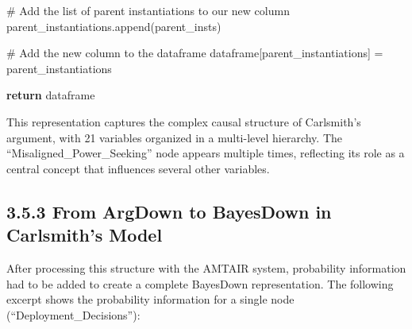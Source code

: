 \documentclass[
  11pt,
  letterpaper,
]{book}
\newenvironment{Shaded}{\begin{snugshade}}{\end{snugshade}}
\newcommand{\CommentTok}[1]{\textcolor[rgb]{0.37,0.37,0.37}{#1}}
\newcommand{\ControlFlowTok}[1]{\textcolor[rgb]{0.00,0.23,0.31}{\textbf{#1}}}
\newcommand{\NormalTok}[1]{\textcolor[rgb]{0.00,0.23,0.31}{#1}}
\newcommand{\OperatorTok}[1]{\textcolor[rgb]{0.37,0.37,0.37}{#1}}
\newcommand{\StringTok}[1]{\textcolor[rgb]{0.13,0.47,0.30}{#1}}
\begin{document}
\begin{landscape}
\begin{Shaded}
\begin{Highlighting}[]
        \CommentTok{\# Add the list of parent instantiations to our new column}
\NormalTok{        parent\_instantiations.append(parent\_insts)}

    \CommentTok{\# Add the new column to the dataframe}
\NormalTok{    dataframe[}\StringTok{\textquotesingle{}parent\_instantiations\textquotesingle{}}\NormalTok{] }\OperatorTok{=}\NormalTok{ parent\_instantiations}

    \ControlFlowTok{return}\NormalTok{ dataframe}
\end{Highlighting}
\end{Shaded}

This representation captures the complex causal structure of Carlsmith's
argument, with 21 variables organized in a multi-level hierarchy. The
``Misaligned\_Power\_Seeking'' node appears multiple times, reflecting
its role as a central concept that influences several other variables.

\subsection*{3.5.3 From ArgDown to BayesDown in Carlsmith's
Model}\label{from-argdown-to-bayesdown-in-carlsmiths-model}

After processing this structure with the AMTAIR system, probability
information had to be added to create a complete BayesDown
representation. The following excerpt shows the probability information
for a single node (``Deployment\_Decisions''):


\end{landscape}
\end{document}
